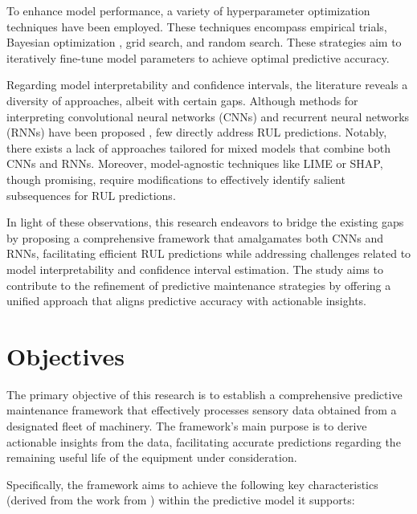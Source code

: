 \documentclass{IEEEtran}
\begin{document}
        To enhance model performance, a variety of hyperparameter optimization techniques have been employed. These techniques encompass empirical trials, Bayesian optimization \cite{phm2021-1st-cnn}, grid search, and random search. These strategies aim to iteratively fine-tune model parameters to achieve optimal predictive accuracy.

        Regarding model interpretability and confidence intervals, the literature reveals a diversity of approaches, albeit with certain gaps. Although methods for interpreting convolutional neural networks (CNNs) and recurrent neural networks (RNNs) have been proposed \cite{Rojat2021}, few directly address RUL predictions. Notably, there exists a lack of approaches tailored for mixed models that combine both CNNs and RNNs. Moreover, model-agnostic techniques like LIME or SHAP, though promising, require modifications to effectively identify salient subsequences for RUL predictions.

        In light of these observations, this research endeavors to bridge the existing gaps by proposing a comprehensive framework that amalgamates both CNNs and RNNs, facilitating efficient RUL predictions while addressing challenges related to model interpretability and confidence interval estimation. The study aims to contribute to the refinement of predictive maintenance strategies by offering a unified approach that aligns predictive accuracy with actionable insights.

    \section{Objectives}

        The primary objective of this research is to establish a comprehensive predictive maintenance framework that effectively processes sensory data obtained from a designated fleet of machinery. The framework's main purpose is to derive actionable insights from the data, facilitating accurate predictions regarding the remaining useful life of the equipment under consideration.

        Specifically, the framework aims to achieve the following key characteristics (derived from the work from \cite{Rojat2021}) within the predictive model it supports:
\end{document}
